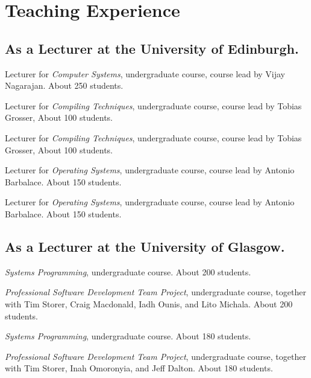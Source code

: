 \section{Teaching Experience}

\subsection{As a Lecturer at the University of Edinburgh.}

\begin{cvitemize}[2022 - 2023]
    \item Lecturer for \emph{Computer Systems}, undergraduate course, course lead by Vijay Nagarajan. About 250 students.
    \item Lecturer for \emph{Compiling Techniques}, undergraduate course, course lead by Tobias Grosser, About 100 students.
\end{cvitemize}

\begin{cvitemize}[2021 - 2022]
    \item Lecturer for \emph{Compiling Techniques}, undergraduate course, course lead by Tobias Grosser, About 100 students.
    \item Lecturer for \emph{Operating Systems}, undergraduate course, course lead by Antonio Barbalace. About 150 students.
\end{cvitemize}

\begin{cvitemize}[2020 - 2021]
    \item Lecturer for \emph{Operating Systems}, undergraduate course, course lead by Antonio Barbalace. About 150 students.
\end{cvitemize}

\subsection{As a Lecturer at the University of Glasgow.}

\begin{cvitemize}[2019 - 2020]
    \item \emph{Systems Programming}, undergraduate course. About 200 students.
    \item \emph{Professional Software Development Team Project}, undergraduate course, together with  Tim Storer, Craig Macdonald, Iadh Ounis, and Lito Michala. About 200 students.
\end{cvitemize}

\begin{cvitemize}[2018 - 2019]
    \item \emph{Systems Programming}, undergraduate course. About 180 students.
    \item \emph{Professional Software Development Team Project}, undergraduate course, together with  Tim Storer, Inah Omoronyia, and Jeff Dalton. About 180 students.
\end{cvitemize}

